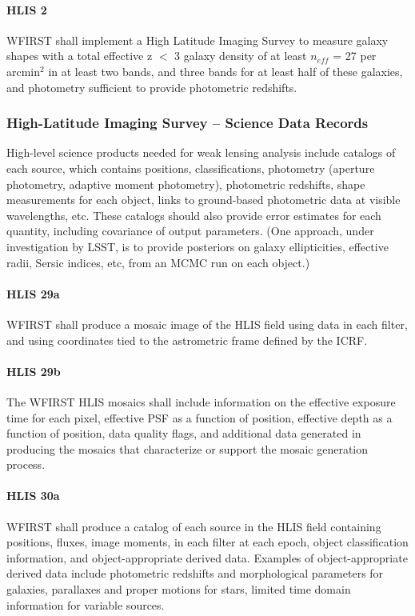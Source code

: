 \paragraph{HLIS 2} WFIRST shall implement a High Latitude Imaging Survey to
measure galaxy shapes with a total effective z $<$ 3 galaxy density of at least
$n_{eff}$ = 27 per arcmin$^2$ in at least two bands, and three bands for at least half
of these galaxies, and photometry sufficient to provide photometric redshifts.

\subsubsection{High-Latitude Imaging Survey – Science Data Records}

High-level science products needed for weak lensing analysis include catalogs of
each source, which contains positions, classifications, photometry (aperture
photometry, adaptive moment photometry), photometric redshifts, shape
measurements for each object, links to ground-based photometric data at visible
wavelengths, etc. These catalogs should also provide error estimates for each
quantity, including covariance of output parameters. (One approach, under
investigation by LSST, is to provide posteriors on galaxy ellipticities,
effective radii, Sersic indices, etc, from an MCMC run on each object.)

\paragraph{HLIS 29a} WFIRST shall produce a mosaic image of the HLIS field using data in
each filter, and using coordinates tied to the astrometric frame defined by the
ICRF.

\paragraph{HLIS 29b} The WFIRST HLIS mosaics shall include information on the effective
exposure time for each pixel, effective PSF as a function of position, effective
depth as a function of position, data quality flags, and additional data
generated in producing the mosaics that characterize or support the mosaic
generation process.

\paragraph{HLIS 30a} WFIRST shall produce a catalog of each source in the HLIS field
containing positions, fluxes, image moments, in each filter at each epoch,
object classification information, and object-appropriate derived data. Examples
of object-appropriate derived data include photometric redshifts and
morphological parameters for galaxies, parallaxes and proper motions for stars,
limited time domain information for variable sources.


